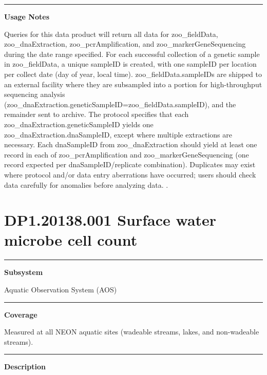 \documentclass[]{article}
\begin{document}
\begin{center}\rule{0.5\linewidth}{\linethickness}\end{center}

\textbf{Usage Notes}

Queries for this data product will return all data for zoo\_fieldData,
zoo\_dnaExtraction, zoo\_pcrAmplification, and zoo\_markerGeneSequencing
during the date range specified. For each successful collection of a
genetic sample in zoo\_fieldData, a unique sampleID is created, with one
sampleID per location per collect date (day of year, local time).
zoo\_fieldData.sampleIDs are shipped to an external facility where they
are subsampled into a portion for high-throughput sequencing analysis
(zoo\_dnaExtraction.geneticSampleID=zoo\_fieldData.sampleID), and the
remainder sent to archive. The protocol specifies that each
zoo\_dnaExtraction.geneticSampleID yields one
zoo\_dnaExtraction.dnaSampleID, except where multiple extractions are
necessary. Each dnaSampleID from zoo\_dnaExtraction should yield at
least one record in each of zoo\_pcrAmplification and
zoo\_markerGeneSequencing (one record expected per dnaSampleID/replicate
combination). Duplicates may exist where protocol and/or data entry
aberrations have occurred; users should check data carefully for
anomalies before analyzing data. \newpage
.

\section{DP1.20138.001 Surface water microbe cell
count}\label{dp1.20138.001-surface-water-microbe-cell-count}

\begin{center}\rule{0.5\linewidth}{\linethickness}\end{center}

\textbf{Subsystem}

Aquatic Observation System (AOS)

\begin{center}\rule{0.5\linewidth}{\linethickness}\end{center}

\textbf{Coverage}

Measured at all NEON aquatic sites (wadeable streams, lakes, and
non-wadeable streams).

\begin{center}\rule{0.5\linewidth}{\linethickness}\end{center}

\textbf{Description}
\end{document}
